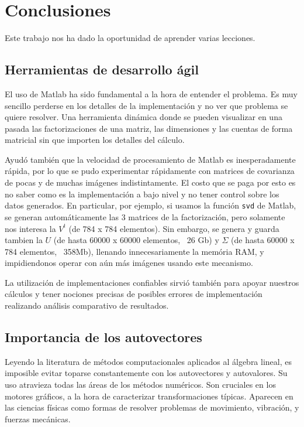 \section{Conclusiones}

Este trabajo nos ha dado la oportunidad de aprender varias lecciones.

\subsection{Herramientas de desarrollo \'agil}

El uso de Matlab ha sido fundamental a la hora de entender el problema.
Es muy sencillo perderse en los detalles de la implementaci\'on y no ver que
problema se quiere resolver. Una herramienta din\'amica donde se pueden visualizar
en una pasada las factorizaciones de una matriz, las dimensiones y las cuentas
de forma matricial sin que importen los detalles del c\'alculo.

Ayud\'o tambi\'en que la velocidad de procesamiento de Matlab es inesperadamente
r\'apida, por lo que se pudo experimentar r\'apidamente con matrices de covarianza
de pocas y de muchas im\'agenes indistintamente. El costo que se paga por esto es
no saber como es la implementaci\'on a bajo nivel y no tener control sobre los datos generados.
En particular, por ejemplo, si usamos la funci\'on \texttt{svd} de Matlab, se
generan autom\'aticamente las 3 matrices de la factorizaci\'on, pero solamente nos interesa
la $V^t$ (de 784 x 784 elementos). Sin embargo, se genera y guarda tambien la $U$ (de hasta
60000 x 60000 elementos, ~26 Gb) y $\Sigma$ (de hasta 60000 x 784 elementos, ~358Mb), llenando innecesariamente
la mem\'oria RAM, y impidiendonos operar con a\'un m\'as im\'agenes usando este mecanismo.

La utilizaci\'on de implementaciones confiables sirvi\'o tambi\'en para apoyar nuestros
c\'alculos y tener nociones precisas de posibles errores de implementaci\'on
realizando an\'alisis comparativo de resultados.

\subsection{Importancia de los autovectores}

Leyendo la literatura de m\'etodos computacionales aplicados al \'algebra lineal, es
imposible evitar toparse constantemente con los autovectores y autovalores. Su
uso atravieza todas las \'areas de los m\'etodos num\'ericos. Son cruciales
en los motores gr\'aficos, a la hora de caracterizar transformaciones t\'ipicas.
Aparecen en las ciencias f\'isicas como formas de resolver problemas de movimiento,
vibraci\'on, y fuerzas mec\'anicas.

